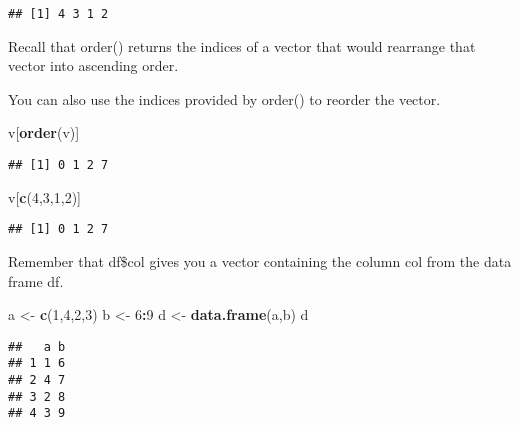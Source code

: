 \documentclass[
]{article}
\newenvironment{Shaded}{\begin{snugshade}}{\end{snugshade}}
\newcommand{\DecValTok}[1]{\textcolor[rgb]{0.00,0.00,0.81}{#1}}
\newcommand{\KeywordTok}[1]{\textcolor[rgb]{0.13,0.29,0.53}{\textbf{#1}}}
\newcommand{\NormalTok}[1]{#1}
\newcommand{\OperatorTok}[1]{\textcolor[rgb]{0.81,0.36,0.00}{\textbf{#1}}}
\newcommand{\StringTok}[1]{\textcolor[rgb]{0.31,0.60,0.02}{#1}}
\begin{document}
\begin{verbatim}
## [1] 4 3 1 2
\end{verbatim}

Recall that order() returns the indices of a vector that would rearrange
that vector into ascending order.

You can also use the indices provided by order() to reorder the vector.

\begin{Shaded}
\begin{Highlighting}[]
\NormalTok{v[}\KeywordTok{order}\NormalTok{(v)]}
\end{Highlighting}
\end{Shaded}

\begin{verbatim}
## [1] 0 1 2 7
\end{verbatim}

\begin{Shaded}
\begin{Highlighting}[]
\NormalTok{v[}\KeywordTok{c}\NormalTok{(}\DecValTok{4}\NormalTok{,}\DecValTok{3}\NormalTok{,}\DecValTok{1}\NormalTok{,}\DecValTok{2}\NormalTok{)]}
\end{Highlighting}
\end{Shaded}

\begin{verbatim}
## [1] 0 1 2 7
\end{verbatim}

Remember that df\$col gives you a vector containing the column col from
the data frame df.

\begin{Shaded}
\begin{Highlighting}[]
\NormalTok{a <-}\StringTok{ }\KeywordTok{c}\NormalTok{(}\DecValTok{1}\NormalTok{,}\DecValTok{4}\NormalTok{,}\DecValTok{2}\NormalTok{,}\DecValTok{3}\NormalTok{)}
\NormalTok{b <-}\StringTok{ }\DecValTok{6}\OperatorTok{:}\DecValTok{9}
\NormalTok{d <-}\StringTok{ }\KeywordTok{data.frame}\NormalTok{(a,b)}
\NormalTok{d}
\end{Highlighting}
\end{Shaded}

\begin{verbatim}
##   a b
## 1 1 6
## 2 4 7
## 3 2 8
## 4 3 9
\end{verbatim}

\begin{Shaded}
\end{Shaded}
\end{document}

